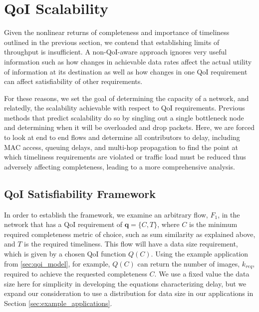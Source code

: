 \section{QoI Scalability}
\label{sec:qoi_scalability}


Given the nonlinear returns of completeness and importance of timeliness outlined in the previous section, we contend that establishing limits of throughput is insufficient.  A non-QoI-aware approach ignores very useful information such as how changes in achievable data rates affect the actual utility of information at its destination as well as how changes in one QoI requirement can affect satisfiability of other requirements.  

For these reasons, we set the goal of determining the capacity of a network, and relatedly, the scalability achievable with respect to QoI requirements.  Previous methods that predict scalability do so by singling out a single bottleneck node and determining when it will be overloaded and drop packets. Here, we are forced to look at end to end flows and determine all contributors to delay, including MAC access, queuing delays, and multi-hop propagation to find the point at which timeliness requirements are violated or traffic load must be reduced thus adversely affecting completeness, leading to a more comprehensive analysis.

\subsection{QoI Satisfiability Framework}
In order to establish the framework, we examine an arbitrary flow, $F_1$, in the network that has a QoI requirement of $\mathbf{q} = \{C, T\}$, where $C$ is the minimum required completeness metric of choice, such as sum similarity as explained above, and $T$ is the required timeliness.  This flow will have a data size requirement, which is given by a chosen QoI function $Q(C)$.  Using the example application from \ref{sec:qoi_model}, for example, $Q(C)$ can return the number of images, $k_{req}$, required to achieve the requested completeness $C$. %
We use a fixed value the data size here for simplicity in developing the equations characterizing delay, but we expand our consideration to use a distribution for data size in our applications in Section \ref{sec:example_applications}.

